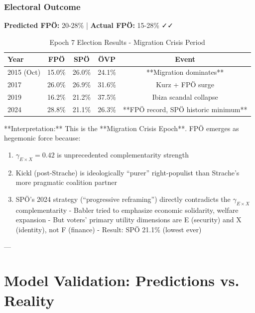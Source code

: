 \subsubsection{Electoral Outcome}

\textbf{Predicted FPÖ:} 20-28\% | \textbf{Actual FPÖ:} 15-28\% ✓✓

\begin{table}[h]
\centering
\caption{Epoch 7 Election Results - Migration Crisis Period}
\label{tab:epoch7-results}
\begin{tabular}{lcccc}
\toprule
Year & FPÖ & SPÖ & ÖVP & Event \\
\midrule
2015 (Oct) & 15.0\% & 26.0\% & 24.1\% & **Migration dominates** \\
2017 & 26.0\% & 26.9\% & 31.6\% & Kurz + FPÖ surge \\
2019 & 16.2\% & 21.2\% & 37.5\% & Ibiza scandal collapse \\
2024 & 28.8\% & 21.1\% & 26.3\% & **FPÖ record, SPÖ historic minimum** \\
\bottomrule
\end{tabular}
\end{table}

**Interpretation:** This is the **Migration Crisis Epoch**. FPÖ emerges as hegemonic force because:

\begin{enumerate}

\item $\gamma_{E \times X} = 0.42$ is unprecedented complementarity strength
\item Kickl (post-Strache) is ideologically ``purer'' right-populist than Strache's more pragmatic coalition partner
\item SPÖ's 2024 strategy (``progressive reframing'') directly contradicts the $\gamma_{E \times X}$ complementarity
  - Babler tried to emphasize economic solidarity, welfare expansion
  - But voters' primary utility dimensions are E (security) and X (identity), not F (finance)
  - Result: SPÖ 21.1\% (lowest ever)

\end{enumerate}

---

\clearpage


\section{Model Validation: Predictions vs. Reality}
\label{sec:validation}

